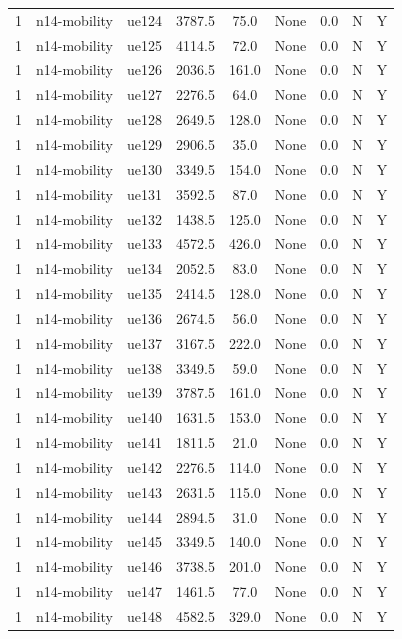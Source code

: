 \begin{table}[ht]
\begin{tabular}{|c|c|c|c|c|c|c|c|c|}
1 & n14-mobility & ue124 & 3787.5 & 75.0 & None & 0.0 & N & Y \\
1 & n14-mobility & ue125 & 4114.5 & 72.0 & None & 0.0 & N & Y \\
1 & n14-mobility & ue126 & 2036.5 & 161.0 & None & 0.0 & N & Y \\
1 & n14-mobility & ue127 & 2276.5 & 64.0 & None & 0.0 & N & Y \\
1 & n14-mobility & ue128 & 2649.5 & 128.0 & None & 0.0 & N & Y \\
1 & n14-mobility & ue129 & 2906.5 & 35.0 & None & 0.0 & N & Y \\
1 & n14-mobility & ue130 & 3349.5 & 154.0 & None & 0.0 & N & Y \\
1 & n14-mobility & ue131 & 3592.5 & 87.0 & None & 0.0 & N & Y \\
1 & n14-mobility & ue132 & 1438.5 & 125.0 & None & 0.0 & N & Y \\
1 & n14-mobility & ue133 & 4572.5 & 426.0 & None & 0.0 & N & Y \\
1 & n14-mobility & ue134 & 2052.5 & 83.0 & None & 0.0 & N & Y \\
1 & n14-mobility & ue135 & 2414.5 & 128.0 & None & 0.0 & N & Y \\
1 & n14-mobility & ue136 & 2674.5 & 56.0 & None & 0.0 & N & Y \\
1 & n14-mobility & ue137 & 3167.5 & 222.0 & None & 0.0 & N & Y \\
1 & n14-mobility & ue138 & 3349.5 & 59.0 & None & 0.0 & N & Y \\
1 & n14-mobility & ue139 & 3787.5 & 161.0 & None & 0.0 & N & Y \\
1 & n14-mobility & ue140 & 1631.5 & 153.0 & None & 0.0 & N & Y \\
1 & n14-mobility & ue141 & 1811.5 & 21.0 & None & 0.0 & N & Y \\
1 & n14-mobility & ue142 & 2276.5 & 114.0 & None & 0.0 & N & Y \\
1 & n14-mobility & ue143 & 2631.5 & 115.0 & None & 0.0 & N & Y \\
1 & n14-mobility & ue144 & 2894.5 & 31.0 & None & 0.0 & N & Y \\
1 & n14-mobility & ue145 & 3349.5 & 140.0 & None & 0.0 & N & Y \\
1 & n14-mobility & ue146 & 3738.5 & 201.0 & None & 0.0 & N & Y \\
1 & n14-mobility & ue147 & 1461.5 & 77.0 & None & 0.0 & N & Y \\
1 & n14-mobility & ue148 & 4582.5 & 329.0 & None & 0.0 & N & Y \\

\end{tabular}
\end{table}
